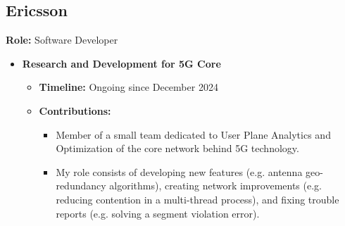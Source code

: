 \subsection{Ericsson}
\textbf{Role:} Software Developer
\begin{itemize}
    \item \textbf{Research and Development for 5G Core}
    \begin{itemize}
        \item \textbf{Timeline:} Ongoing since December 2024
        \item \textbf{Contributions:}
        \begin{itemize}
            \item Member of a small team dedicated to User Plane Analytics and Optimization of the core network behind 5G technology.
            \item My role consists of developing new features (e.g. antenna geo-redundancy algorithms), creating network improvements (e.g. reducing contention in a multi-thread process), and fixing trouble reports (e.g. solving a segment violation error).
        \end{itemize}
    \end{itemize}
\end{itemize}
\hfill

